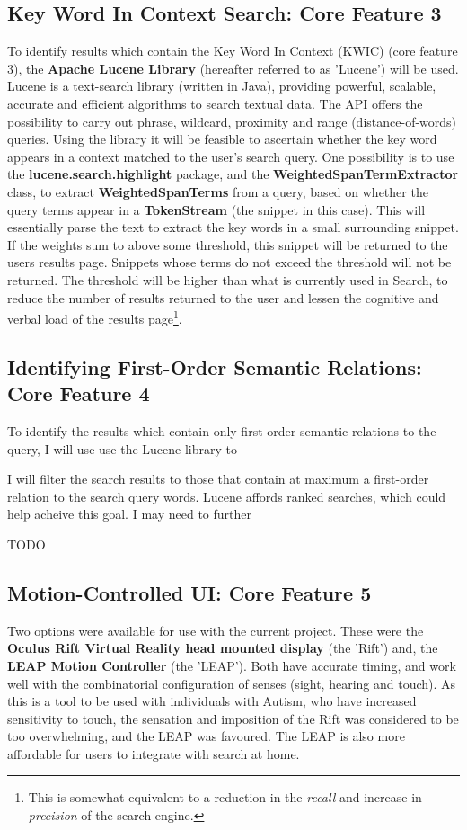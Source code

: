\documentclass[a4paper, 10pt]{article}
\begin{document}
\subsection{Key Word In Context Search: Core Feature 3}\label{apache}
To identify results which contain the Key Word In Context (KWIC)\cite{kwic} (core feature 3), the \textbf{Apache Lucene Library} (hereafter referred to as 'Lucene') will be used. Lucene is a text-search library (written in Java), providing powerful, scalable, accurate and efficient algorithms to search textual data. The API offers the possibility to carry out phrase, wildcard, proximity and range (distance-of-words) queries. Using the library it will be feasible to ascertain whether the key word appears in a context matched to the user's search query. One possibility is to use the \textbf{lucene.search.highlight} package, and the \textbf{WeightedSpanTermExtractor} class, to extract \textbf{WeightedSpanTerms} from a query, based on whether the query terms appear in a \textbf{TokenStream} (the snippet in this case). This will essentially parse the text to extract the key words in a small surrounding snippet. If the weights sum to above some threshold, this snippet will be returned to the users results page. Snippets whose terms do not exceed the threshold will not be returned. The threshold will be higher than what is currently used in Search, to reduce the number of results returned to the user and lessen the cognitive and verbal load of the results page\footnote{This is somewhat equivalent to a reduction in the \textit{recall} and increase in \textit{precision} of the search engine.}.

\subsection{Identifying First-Order Semantic Relations: Core Feature 4}\label{apache}
To identify the results which contain only first-order semantic relations to the query, I will use use the Lucene library to 

I will filter the search results to those that contain at maximum a first-order relation to the search query words. Lucene affords ranked searches, which could help acheive this goal. I may need to  further 

TODO

\subsection{Motion-Controlled UI: Core Feature 5}\label{hardware}
Two options were available for use with the current project. These were the \textbf{Oculus Rift Virtual Reality head mounted display} (the 'Rift') and, the \textbf{LEAP Motion Controller} (the 'LEAP'). Both have accurate timing, and work well with the combinatorial configuration of senses (sight, hearing and touch). As this is a tool to be used with individuals with Autism, who have increased sensitivity to touch, the sensation and imposition of the Rift was considered to be too overwhelming, and the LEAP was favoured. The LEAP is also more affordable for users to integrate with search at home. 
\end{document}
